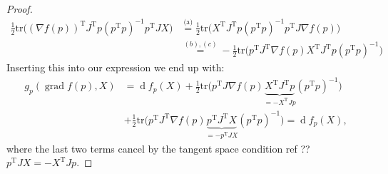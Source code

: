 \begin{proof}
    \begin{equation}
        \begin{split}
        \tfrac{1}{2} \mathrm{tr}\big((\nabla f(p)) ^{\mathrm{T}}J ^{\mathrm{T}}p(p ^{\mathrm{T}}p)^{-1}p ^{\mathrm{T}}JX\big)&\overset{\text{(a)}}{=}\tfrac{1}{2} \mathrm{tr}\big(X ^{\mathrm{T}}J ^{\mathrm{T}}p (p ^{\mathrm{T}}p)^{-1}p ^{\mathrm{T}}J \nabla f(p)\big)\\
        &\overset{(b),(c)}{=}-\tfrac{1}{2} \mathrm{tr}\big(p ^{\mathrm{T}}J ^{\mathrm{T}} \nabla f(p)X ^{\mathrm{T}}J ^{\mathrm{T}}p(p ^{\mathrm{T}}p)^{-1}\big)
        \end{split}
    \end{equation}
    Inserting this into our expression we end up with:
    \begin{equation}
        \begin{split}
        g_{p}(\operatorname{grad}f(p),X)&= \operatorname{d}f_{p}(X)+\tfrac{1}{2} \mathrm{tr}\big(p ^{\mathrm{T}}J \nabla f(p)\underbrace{X ^{\mathrm{T}}J ^{\mathrm{T}}p}_{=-X ^{\mathrm{T}}Jp}(p ^{\mathrm{T}}p)^{-1}\big)\\
        &+\tfrac{1}{2}\mathrm{tr}\big(p ^{\mathrm{T}}J ^{\mathrm{T}}\nabla f(p) \underbrace{p ^{\mathrm{T}}J ^{\mathrm{T}}X}_{=-p^ {\mathrm{T}}JX}(p ^{\mathrm{T}}p)^{-1}\big)=\operatorname{d}f_{p}(X),
        \end{split}
    \end{equation}
    where the last two terms cancel by the tangent space condition ref ?? $p ^{\mathrm{T}}JX=-X ^{\mathrm{T}}Jp$.
\end{proof}